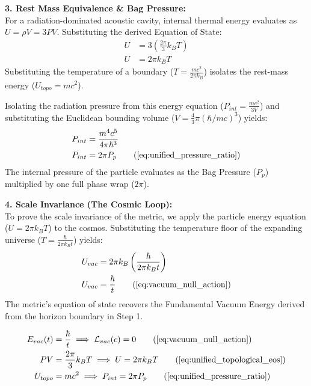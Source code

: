 \textbf{3. Rest Mass Equivalence \& Bag Pressure:} \\
For a radiation-dominated acoustic cavity, internal thermal energy evaluates as $U = \rho V = 3PV$. Substituting the derived Equation of State:
\begin{align}
    U &= 3 \left( \frac{2\pi}{3} k_B T \right)  \\
    U &= 2\pi k_B T 
\end{align}
Substituting the temperature of a boundary ($T = \frac{mc^2}{2\pi k_B}$) isolates the rest-mass energy ($U_{topo} = mc^2$). 

Isolating the radiation pressure from this energy equation ($P_{int} = \frac{m c^2}{3 V}$) and substituting the Euclidean bounding volume ($V = \frac{4}{3}\pi (\hbar/mc)^3$) yields: 
\begin{align}
    P_{int} &= \frac{m^4 c^5}{4\pi \hbar^3}  \\
    P_{int} &= 2\pi P_p \tag{\ref{eq:unified_pressure_ratio}}
\end{align}
The internal pressure of the particle evaluates as the Bag Pressure ($P_p$) multiplied by one full phase wrap ($2\pi$). 

\textbf{4. Scale Invariance (The Cosmic Loop):} \\
To prove the scale invariance of the metric, we apply the particle energy equation ($U = 2\pi k_B T$) to the cosmos. Substituting the temperature floor of the expanding universe ($T = \frac{\hbar}{2\pi k_B t}$) yields:
\begin{align}
    U_{vac} &= 2\pi k_B \left( \frac{\hbar}{2\pi k_B t} \right)  \\
    U_{vac} &= \frac{\hbar}{t} \tag{\ref{eq:vacuum_null_action}}
\end{align}
The metric's equation of state recovers the Fundamental Vacuum Energy derived from the horizon boundary in Step 1. 

\begin{tcolorbox}[recallbox, title={\ref{box:unified_eos}. The Unified Equation of State}]
\begin{align}
    E_{vac}(t) &= \frac{\hbar}{t} \implies \mathcal{L}_{vac}(c) = 0 \tag{\ref{eq:vacuum_null_action}} \\
    PV &= \frac{2\pi}{3} k_B T \implies U = 2\pi k_B T \tag{\ref{eq:unified_topological_eos}} \\
    U_{topo} &= mc^2 \implies P_{int} = 2\pi P_p \tag{\ref{eq:unified_pressure_ratio}}
\end{align}
\end{tcolorbox}





